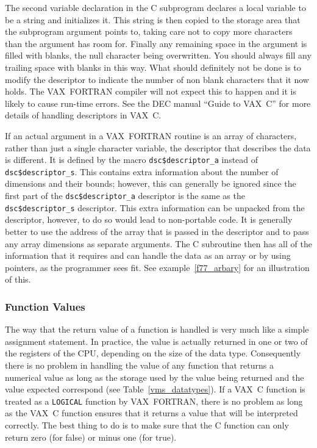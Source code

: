 \documentclass[twoside,11pt,nolof]{starlink}
\begin{document}
The second variable declaration in the C subprogram declares a local variable
to be a string and initializes it. This string is then copied to the storage
area that the subprogram argument points to, taking care not to copy more
characters than the argument has room for. Finally any remaining space in the
argument is filled with blanks, the null character being overwritten. You
should always fill any trailing space with blanks in this way. What should
definitely not be done is to modify the descriptor to indicate the number of
non blank characters that it now holds. The VAX~FORTRAN compiler will not
expect this to happen and it is likely to cause run-time errors. See the DEC
manual ``Guide to VAX~C'' for more details of handling descriptors in VAX~C\@.

If an actual argument in a VAX~FORTRAN routine is an array of characters, rather
than just a single character variable, the descriptor that describes the data
is different. It is defined by the macro \texttt{dsc\$descriptor\_a} instead of
\texttt{dsc\$descriptor\_s}. This contains extra information about the number of
dimensions and their bounds; however, this can generally be ignored since the
first part of the \texttt{dsc\$descriptor\_a} descriptor is the same as the
\texttt{dsc\$descriptor\_s} descriptor. This extra information can be unpacked from the
descriptor, however, to do so would lead to non-portable code. It is generally
better to use the address of the array that is passed in the descriptor and to
pass any array dimensions as separate arguments. The C subroutine then has all
of the information that it requires and can handle the data as an array or by
using pointers, as the programmer sees fit. See example~\ref{f77_arbary} for
an illustration of this.

\subsubsection{Function Values}

The way that the return value of a function is handled is very much like a
simple assignment statement. In practice, the value is actually returned in one
or two of the registers of the CPU, depending on the size of the data type.
Consequently there is no problem in handling the value of any function that
returns a numerical value as long as the storage used by the value being
returned and the value expected correspond
(see Table~\ref{vms_datatypes}).
If a VAX~C function is treated as a \texttt{LOGICAL} function by VAX~FORTRAN,
there is no problem as long as the VAX~C function ensures that it returns a
value that will be interpreted correctly.
The best thing to do is to make sure that the C function can only return zero
(for false) or minus one (for true).
\end{document}
